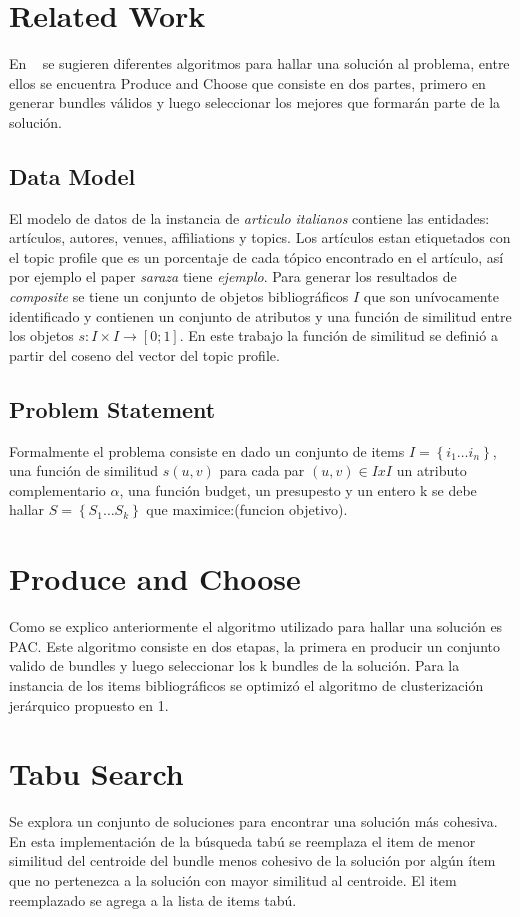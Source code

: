 \section{Related Work}
En ~\cite{compositeRetrival} se sugieren diferentes algoritmos para hallar una solución al problema, entre ellos se encuentra Produce and Choose que consiste en dos partes, primero en generar bundles válidos y luego seleccionar los mejores que formarán parte de la solución.
\subsection{Data Model}\label{body-data-model}
El modelo de datos de la instancia de \textit{articulo italianos} contiene las entidades: artículos, autores, venues, affiliations y topics. Los artículos estan etiquetados con el topic profile que es un porcentaje de cada tópico encontrado en el artículo, así por ejemplo el paper \textit{saraza} tiene \textit{ejemplo}. Para generar los resultados de \textit{composite} se tiene un conjunto de objetos bibliográficos $I$ que son unívocamente identificado y contienen un conjunto de atributos y una función de similitud entre los objetos $ s: I \times I \rightarrow [0;1]$. En este trabajo la función de similitud se definió a partir del coseno del vector del topic profile.\\
\subsection{Problem Statement}
Formalmente el problema consiste en dado un conjunto de items $ I=\left\{i_1 \ldots i_n\right\} $, una función de similitud $ s(u,v) $ para cada par $ (u,v) \in IxI $ un atributo complementario $\alpha$, una función budget, un presupesto y un entero k se debe hallar $ S=\left\{S_1 \ldots S_k\right\} $ que maximice:(funcion objetivo).

\section{Produce and Choose}
Como se explico anteriormente el algoritmo utilizado para hallar una solución es PAC. Este algoritmo consiste en dos etapas, la primera en producir un conjunto valido de bundles y luego seleccionar los k bundles de la solución. Para la instancia de los items bibliográficos se optimizó el algoritmo de clusterización jerárquico propuesto en 1.
 
\section{Tabu Search}
Se explora un conjunto de soluciones para encontrar una solución más cohesiva. En esta implementación de la búsqueda tabú se reemplaza el item de menor similitud del centroide del bundle menos cohesivo de la solución por algún ítem que no pertenezca a la solución con mayor similitud al centroide. El item reemplazado se agrega a la lista de items tabú.